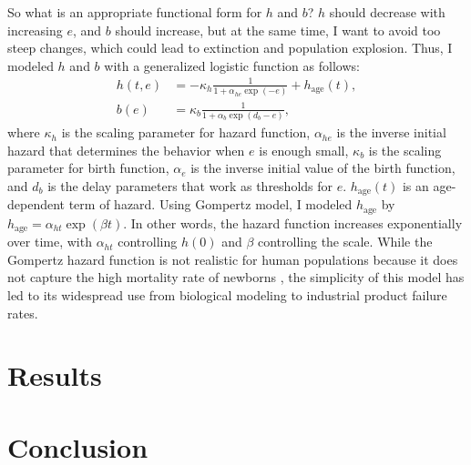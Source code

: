 So what is an appropriate functional form for $h$ and $b$? $h$ should decrease with increasing $e$, and $b$ should increase, but at the same time, I want to avoid too steep changes, which could lead to extinction and population explosion. Thus, I modeled $h$ and $b$ with a generalized logistic function \citep{richardsFlexibleGrowthFunction1959} as follows:
\begin{align}
  h(t, e) &= - \kappa_{h} \frac{1}{1 + \alpha_{he}\exp( - e)} + h_{\textrm{age}}(t), \\
  b(e) &=  \kappa_{b} \frac{1}{1 + \alpha_{b}\exp(d_{b} - e)},
\end{align}
where $\kappa_{h}$ is the scaling parameter for hazard function, $\alpha_{he}$ is the inverse initial hazard that determines the behavior when $e$ is enough small, $\kappa_{b}$ is the scaling parameter for birth function, $\alpha_{e}$ is the inverse initial value of the birth function, and $d_{b}$ is the delay parameters that work as thresholds for $e$. $h_{\textrm{age}}(t)$ is an age-dependent term of hazard. Using Gompertz model\citep{gompertzXXIVNatureFunction1825,kirkwoodDecipheringDeathCommentary2015}, I modeled $h_{\textrm{age}}$ by $h_{\textrm{age}} = \alpha_{ht} \exp(\beta t)$. In other words, the hazard function increases exponentially over time, with $\alpha_{ht}$ controlling $h(0)$ and $\beta$ controlling the scale. While the Gompertz hazard function is not realistic for human populations because it does not capture the high mortality rate of newborns \citep{makehamLawMortalityConstruction1860}, the simplicity of this model has led to its widespread use from biological modeling to industrial product failure rates.


\section{Results}

\section{Conclusion}